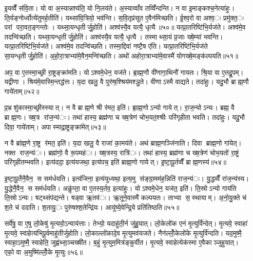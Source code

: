 इ॒यव्वैँ स॑वि॒ता। यो वा अ॒स्यान्नश्य॑ति॒ यो नि॒लय॑ते। अ॒स्याव्वाँव तव्विँ॑न्दन्ति। न वा इ॒माङ्कश्च॒नेत्या॑हुः। ति॒र्यङ्नोर्ध्वोत्ये॑तुमर्ह॒तीति॑। यथ्सा॑वि॒त्रियो॒ भव॑न्ति। स॒वि॒तृप्र॑सूत ए॒वैन॑मिच्छति। ई॒श्व॒रो वा अश्व॒ः प्रमु॑क्त॒ः परां परा॒वत॒ङ्गन्तोः। यथ्सा॒यन्धृतीर्जु॒होति॑। अश्व॑स्यै॒व यत्यै॒ धृत्यै॥५०॥ यत्प्रा॒तरिष्टि॑भि॒र्यज॑ते। अश्व॑मे॒व तदन्वि॑च्छति। यथ्सा॒यन्धृतीर्जु॒होति॑। अश्व॑स्यै॒व यत्यै॒ धृत्यै। तस्माथ्सा॒यं प्र॒जाः ख्षे॒म्या॑ भवन्ति। यत्प्रा॒तरिष्टि॑भि॒र्यज॑ते। अश्व॑मे॒व तदन्वि॑च्छति। तस्मा॒द्दिवा॑ नष्टै॒ष ए॑ति। यत्प्रा॒तरिष्टि॑भि॒र्यज॑ते सा॒यन्धृतीर्जु॒होति॑। अ॒हो॒रा॒त्राभ्या॑मे॒वैन॒मन्वि॑च्छति। अथो॑ अहोरा॒त्राभ्या॑मे॒वास्मै॑ योगख्षे॒मङ्क॑ल्पयति॥५१॥


अप॒ वा ए॒तस्मा॒च्छ्री रा॒ष्ट्रङ्क्रा॑मति। योऽश्वमे॒धेन॒ यज॑ते। ब्रा॒ह्म॒णौ वी॑णागा॒थिनौ॑ गायतः। श्रि॒या वा ए॒तद्रू॒पम्। यद्वीणा। श्रिय॑मे॒वास्मि॒न्तद्ध॑त्तः। य॒दा खलु॒ वै पुरु॑ष॒श्श्रिय॑मश्ञु॒ते। वीणाऽस्मै वाद्यते। तदा॑हुः। यदु॒भौ ब्राह्म॒णौ गाये॑ताम्॥५२॥

प्र॒भ्रशु॑कास्मा॒च्छ्रीस्स्यात्। न वै ब्राह्म॒णे श्री र॑मत॒ इति॑। ब्रा॒ह्म॒णोऽन्यो गायेत्। रा॒ज॒न्योऽन्यः। ब्रह्म॒ वै ब्राह्म॒णः। ख्ष॒त्र रा॑ज॒न्य॑ः। तथा॑ हास्य॒ ब्रह्म॑णा च ख्ष॒त्रेण॑ चोभ॒यत॒श्श्रीः परि॑गृहीता भवति। तदा॑हुः। यदु॒भौ दिवा॒ गाये॑ताम्। अपास्माद्रा॒ष्ट्रङ्क्रा॑मेत्॥५३॥

न वै ब्रा॑ह्म॒णे रा॒ष्ट्र र॑मत॒ इति॑। य॒दा खलु॒ वै राजा॑ का॒मय॑ते। अथ॑ ब्राह्म॒णञ्जि॑नाति। दिवा ब्राह्म॒णो गा॑येत्। नक्त राज॒न्य॑ः। ब्रह्म॑णो॒ वै रू॒पमह॑ः। ख्ष॒त्रस्य॒ रात्रि॑ः। तथा॑ हास्य॒ ब्रह्म॑णा च ख्ष॒त्रेण॑ चोभ॒यतो॑ रा॒ष्ट्रं परि॑गृहीतम्भवति। इत्य॑ददा॒ इत्य॑यजथा॒ इत्य॑पच॒ इति॑ ब्राह्म॒णो गायेत्। इ॒ष्टा॒पू॒र्तव्वैँ ब्राह्म॒णस्य॑॥५४॥

इ॒ष्टा॒पू॒र्तेनै॒वैन॒ स सम॑र्धयति। इत्य॑जिना॒ इत्य॑युध्यथा॒ इत्य॒मु स॑ङ्ग्रा॒मम॑ह॒न्निति॑ राज॒न्य॑ः। यु॒द्धव्वैँ रा॑ज॒न्य॑स्य। यु॒द्धेनै॒वैन॒ स सम॑र्धयति। अकॢ॑प्ता॒ वा ए॒तस्य॒र्तव॒ इत्या॑हुः। योऽश्वमे॒धेन॒ यज॑त॒ इति॑। ति॒स्रोऽन्यो गाय॑ति ति॒स्रोऽन्यः। षट्थ्संप॑द्यन्ते। षड्वा ऋ॒तव॑ः। ऋ॒तूने॒वास्मै॑ कल्पयतः। ताभ्या स॒स्थायाम्। अ॒नो॒यु॒क्ते च॑ श॒ते च॑ ददाति। श॒तायु॒ः पुरु॑षश्श॒तेन्द्रि॑यः। आयु॑ष्ये॒वेन्द्रि॒ये प्रति॑तिष्ठति॥५५॥


सर्वे॑षु॒ वा ए॒षु लो॒केषु॑ मृ॒त्यवो॒ऽन्वाय॑त्ताः। तेभ्यो॒ यदाहु॑ती॒र्न जु॑हु॒यात्। लो॒केलो॑क एनं मृ॒त्युर्वि॑न्देत्। मृ॒त्यवे॒ स्वाहा॑ मृ॒त्यवे॒ स्वाहेत्य॑भिपू॒र्वमाहु॑तीर्जुहोति। लो॒काल्लो॑कादे॒व मृ॒त्युमव॑यजते। नैन॑ल्लोँ॒केलो॑के मृ॒त्युर्वि॑न्दति। यद॒मुष्मै॒ स्वाहा॒ऽमुष्मै॒ स्वाहेति॒ जुह्व॑थ्स॒ञ्चख्षी॑त। ब॒हुं मृ॒त्युम॒मित्र॑ङ्कुर्वीत। मृ॒त्यवे॒ स्वाहेत्येक॑स्मा ए॒वैकाञ्जुहुयात्। एको॒ वा अ॒मुष्मि॑ल्लोँ॒के मृ॒त्युः॥५६॥

